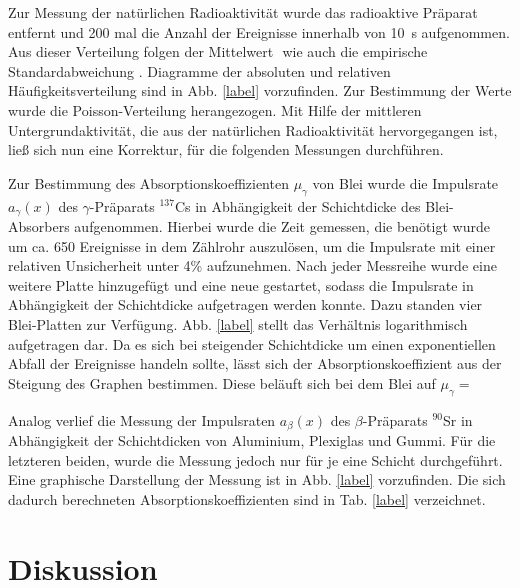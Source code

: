 	Zur Messung der natürlichen Radioaktivität wurde das radioaktive Präparat entfernt und 200 mal die Anzahl der Ereignisse innerhalb von \SI{10}{\second} aufgenommen.
	Aus dieser Verteilung folgen der Mittelwert $ $ wie auch die empirische Standardabweichung $ $.
	Diagramme der absoluten und relativen Häufigkeitsverteilung sind in Abb. \ref{label} vorzufinden.
	Zur Bestimmung der Werte wurde die Poisson-Verteilung herangezogen. %
	Mit Hilfe der mittleren Untergrundaktivität, die aus der natürlichen Radioaktivität hervorgegangen ist, ließ sich nun eine Korrektur, für die folgenden Messungen durchführen.
	
	Zur Bestimmung des Absorptionskoeffizienten $\mu_\gamma$ von Blei wurde die Impulsrate $a_\gamma (x)$ des $\gamma$-Präparats $^{137}$Cs in Abhängigkeit der Schichtdicke des Blei-Absorbers aufgenommen.	
	Hierbei wurde die Zeit gemessen, die benötigt wurde um ca. 650 Ereignisse in dem Zählrohr auszulösen, um die Impulsrate mit einer relativen Unsicherheit unter 4\% aufzunehmen.
	Nach jeder Messreihe wurde eine weitere Platte hinzugefügt und eine neue gestartet, sodass die Impulsrate in Abhängigkeit der Schichtdicke aufgetragen werden konnte.
	Dazu standen vier Blei-Platten zur Verfügung.
	Abb. \ref{label} stellt das Verhältnis logarithmisch aufgetragen dar.
	Da es sich bei steigender Schichtdicke um einen exponentiellen Abfall der Ereignisse handeln sollte, lässt sich der Absorptionskoeffizient aus der Steigung des Graphen bestimmen.
	Diese beläuft sich bei dem Blei auf $\mu_\gamma = $
	
	Analog verlief die Messung der Impulsraten $a_\beta (x)$ des $\beta$-Präparats $^{90}$Sr in Abhängigkeit der Schichtdicken von Aluminium, Plexiglas und Gummi.
	Für die letzteren beiden, wurde die Messung jedoch nur für je eine Schicht durchgeführt.
	Eine graphische Darstellung der Messung ist in Abb. \ref{label} vorzufinden.
	Die sich dadurch berechneten Absorptionskoeffizienten sind in Tab. \ref{label} verzeichnet. 
	
	
\section{Diskussion}
	
	